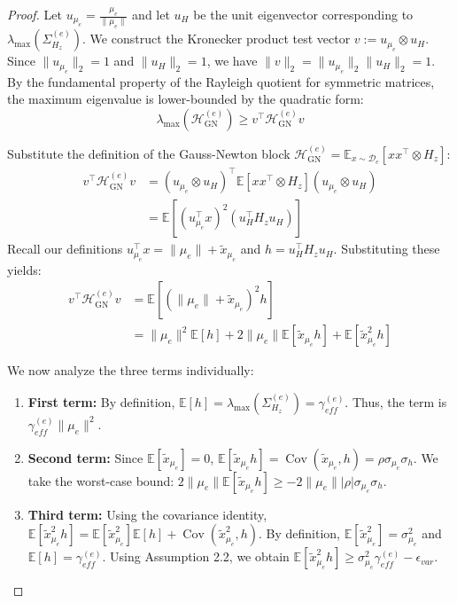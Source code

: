 \documentclass[11pt]{article}
\begin{document}
\begin{proof}
Let $u_{\mu_e} = \frac{\mu_e}{\|\mu_e\|}$ and let $u_H$ be the unit eigenvector corresponding to $\lambda_{\max}(\Sigma_{H_z}^{(e)})$. We construct the Kronecker product test vector $v := u_{\mu_e} \otimes u_H$. Since $\|u_{\mu_e}\|_2 = 1$ and $\|u_H\|_2 = 1$, we have $\|v\|_2 = \|u_{\mu_e}\|_2 \|u_H\|_2 = 1$. By the fundamental property of the Rayleigh quotient for symmetric matrices, the maximum eigenvalue is lower-bounded by the quadratic form:
\begin{equation}
    \lambda_{\max}(\mathcal{H}_{\mathrm{GN}}^{(e)}) \ge v^\top \mathcal{H}_{\mathrm{GN}}^{(e)} v
\end{equation}

Substitute the definition of the Gauss-Newton block $\mathcal{H}_{\mathrm{GN}}^{(e)} = \mathbb{E}_{x \sim \mathcal{D}_e}[xx^\top \otimes H_z]$:
\begin{align}
    v^\top \mathcal{H}_{\mathrm{GN}}^{(e)} v &= (u_{\mu_e} \otimes u_H)^\top \mathbb{E}[xx^\top \otimes H_z] (u_{\mu_e} \otimes u_H) \\
    &= \mathbb{E}[(u_{\mu_e}^\top x)^2 (u_H^\top H_z u_H)]
\end{align}
Recall our definitions $u_{\mu_e}^\top x = \|\mu_e\| + \tilde{x}_{\mu_e}$ and $h = u_H^\top H_z u_H$. Substituting these yields:
\begin{align}
    v^\top \mathcal{H}_{\mathrm{GN}}^{(e)} v &= \mathbb{E}[(\|\mu_e\| + \tilde{x}_{\mu_e})^2 h] \\
    &= \|\mu_e\|^2 \mathbb{E}[h] + 2\|\mu_e\|\mathbb{E}[\tilde{x}_{\mu_e} h] + \mathbb{E}[\tilde{x}_{\mu_e}^2 h]
\end{align}

We now analyze the three terms individually:
\begin{enumerate}
    \item \textbf{First term:} By definition, $\mathbb{E}[h] = \lambda_{\max}(\Sigma_{H_z}^{(e)}) = \gamma_{eff}^{(e)}$. Thus, the term is $\gamma_{eff}^{(e)}\|\mu_e\|^2$.
    \item \textbf{Second term:} Since $\mathbb{E}[\tilde{x}_{\mu_e}] = 0$, $\mathbb{E}[\tilde{x}_{\mu_e} h] = \operatorname{Cov}(\tilde{x}_{\mu_e}, h) = \rho \sigma_{\mu_e} \sigma_h$. We take the worst-case bound: $2\|\mu_e\|\mathbb{E}[\tilde{x}_{\mu_e} h] \ge -2\|\mu_e\| |\rho| \sigma_{\mu_e} \sigma_h$.
    \item \textbf{Third term:} Using the covariance identity, $\mathbb{E}[\tilde{x}_{\mu_e}^2 h] = \mathbb{E}[\tilde{x}_{\mu_e}^2]\mathbb{E}[h] + \operatorname{Cov}(\tilde{x}_{\mu_e}^2, h)$. By definition, $\mathbb{E}[\tilde{x}_{\mu_e}^2] = \sigma_{\mu_e}^2$ and $\mathbb{E}[h] = \gamma_{eff}^{(e)}$. Using Assumption 2.2, we obtain $\mathbb{E}[\tilde{x}_{\mu_e}^2 h] \ge \sigma_{\mu_e}^2 \gamma_{eff}^{(e)} - \epsilon_{var}$.
\end{enumerate}


\end{proof}
\end{document}
